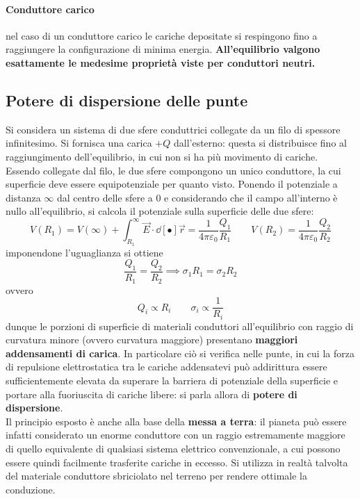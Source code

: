 \paragraph{Conduttore carico} nel caso di un conduttore carico le cariche depositate si respingono fino a raggiungere la configurazione di minima energia. \textbf{All'equilibrio valgono esattamente le medesime proprietà viste per conduttori neutri.}

\subsection{Potere di dispersione delle punte}
Si considera un sistema di due sfere conduttrici collegate da un filo di spessore infinitesimo. Si fornisca una carica $+Q$ dall'esterno: questa si distribuisce fino al raggiungimento dell'equilibrio, in cui non si ha più movimento di cariche. 
\\Essendo collegate dal filo, le due sfere compongono un unico conduttore, la cui superficie deve essere equipotenziale per quanto visto. Ponendo il potenziale a distanza $\infty$ dal centro delle sfere a $0$ e considerando che il campo all'interno è nullo all'equilibrio, si calcola il potenziale sulla superficie delle due sfere:
\[V(R_1) = V(\infty) + \int_{R_1}^\infty \vec{E} \cdot \dd[•]{\vec{r}} = \frac{1}{4 \pi \varepsilon_0} \frac{Q_1}{R_1} \qquad V(R_2) = \frac{1}{4 \pi \varepsilon_0} \frac{Q_2}{R_2}\]
imponendone l'uguaglianza si ottiene
\[\frac{Q_1}{R_1} = \frac{Q_2}{R_2} \implies \sigma_1 R_1 = \sigma_2 R_2\]
ovvero
\[Q_i \propto R_i \qquad \sigma_i \propto \frac{1}{R_i}\]
dunque le porzioni di superficie di materiali conduttori all'equilibrio con raggio di curvatura minore (ovvero curvatura maggiore) presentano \textbf{maggiori addensamenti di carica}. In particolare ciò si verifica nelle punte, in cui la forza di repulsione elettrostatica tra le cariche addensatevi può addirittura essere sufficientemente elevata da superare la barriera di potenziale della superficie e portare alla fuoriuscita di cariche libere: si parla allora di \textbf{potere di dispersione}.
\\Il principio esposto è anche alla base della \textbf{messa a terra}: il pianeta può essere infatti considerato un enorme conduttore con un raggio estremamente maggiore di quello equivalente di qualsiasi sistema elettrico convenzionale, a cui possono essere quindi facilmente trasferite cariche in eccesso. Si utilizza in realtà talvolta del materiale conduttore sbriciolato nel terreno per rendere ottimale la conduzione.


